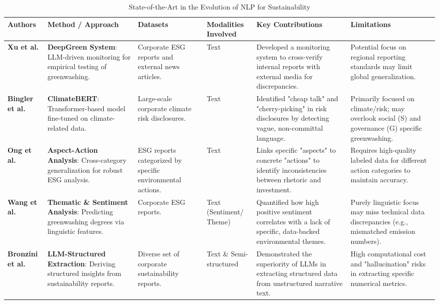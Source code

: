 \begin{landscape}
\begin{table}[p]
\centering
\caption{State-of-the-Art in the Evolution of NLP for Sustainability}
\label{tab:nlp-evolution-sustainability-1}
\small
\renewcommand{\arraystretch}{1.2}
\begin{tabularx}{\linewidth}{|p{1.8cm}|X|X|p{1.8cm}|X|X|}
\hline
Authors & Method / Approach & Datasets & Modalities Involved & Key Contributions & Limitations \\ \hline
\textbf{Xu et al.}  \parencite{chong_xu_bff21576} & \textbf{DeepGreen System}: LLM-driven monitoring for empirical testing of greenwashing. & Corporate ESG reports and external news articles. & Text & Developed a monitoring system to cross-verify internal reports with external media for discrepancies. & Potential focus on regional reporting standards may limit global generalization. \\ \hline
\textbf{Bingler et al.}  \parencite{julia_bingler_268445e3} & \textbf{ClimateBERT}: Transformer-based model fine-tuned on climate-related data. & Large-scale corporate climate risk disclosures. & Text & Identified "cheap talk" and "cherry-picking" in risk disclosures by detecting vague, non-committal language. & Primarily focused on climate/risk; may overlook social (S) and governance (G) specific greenwashing. \\ \hline
\textbf{Ong et al.}  \parencite{keane_ong_369a0b63} & \textbf{Aspect-Action Analysis}: Cross-category generalization for robust ESG analysis. & ESG reports categorized by specific environmental actions. & Text & Links specific "aspects" to concrete "actions" to identify inconsistencies between rhetoric and investment. & Requires high-quality labeled data for different action categories to maintain accuracy. \\ \hline
\textbf{Wang et al.}  \parencite{xiaojia_wang_02351a60} & \textbf{Thematic \& Sentiment Analysis}: Predicting greenwashing degrees via linguistic features. & Corporate ESG reports. & Text (Sentiment/ Theme) & Quantified how high positive sentiment correlates with a lack of specific, data-backed environmental themes. & Purely linguistic focus may miss technical data discrepancies (e.g., mismatched emission numbers). \\ \hline
\textbf{Bronzini et al.}  \parencite{marco_bronzini_bf94d949} & \textbf{LLM-Structured Extraction}: Deriving structured insights from sustainability reports. & Diverse set of corporate sustainability reports. & Text \& Semi-structured & Demonstrated the superiority of LLMs in extracting structured data from unstructured narrative text. & High computational cost and "hallucination" risks in extracting specific numerical metrics. \\ \hline

\end{tabularx}
\end{table}
\end{landscape}

